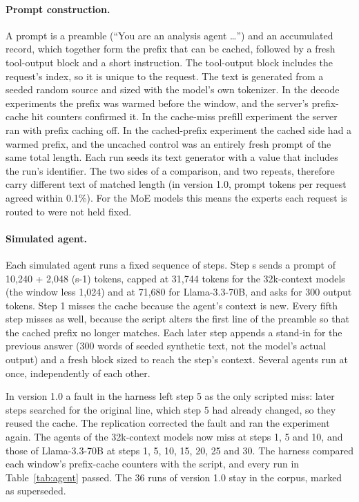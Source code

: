 \documentclass[11pt]{article}
\begin{document}
\paragraph{Prompt construction.} A prompt is a preamble (``You are an analysis agent \ldots{}'') and an accumulated record, which together form the prefix that can be cached, followed by a fresh tool-output block and a short instruction. The tool-output block includes the request's index, so it is unique to the request. The text is generated from a seeded random source and sized with the model's own tokenizer. In the decode experiments the prefix was warmed before the window, and the server's prefix-cache hit counters confirmed it. In the cache-miss prefill experiment the server ran with prefix caching off. In the cached-prefix experiment the cached side had a warmed prefix, and the uncached control was an entirely fresh prompt of the same total length. Each run seeds its text generator with a value that includes the run's identifier. The two sides of a comparison, and two repeats, therefore carry different text of matched length (in version 1.0, prompt tokens per request agreed within 0.1\%). For the MoE models this means the experts each request is routed to were not held fixed.

\paragraph{Simulated agent.} Each simulated agent runs a fixed sequence of steps. Step s sends a prompt of 10,240 + 2,048 (s-1) tokens, capped at 31,744 tokens for the 32k-context models (the window less 1,024) and at 71,680 for Llama-3.3-70B, and asks for 300 output tokens. Step 1 misses the cache because the agent's context is new. Every fifth step misses as well, because the script alters the first line of the preamble so that the cached prefix no longer matches. Each later step appends a stand-in for the previous answer (300 words of seeded synthetic text, not the model's actual output) and a fresh block sized to reach the step's context. Several agents run at once, independently of each other.

In version 1.0 a fault in the harness left step 5 as the only scripted miss: later steps searched for the original line, which step 5 had already changed, so they reused the cache. The replication corrected the fault and ran the experiment again. The agents of the 32k-context models now miss at steps 1, 5 and 10, and those of Llama-3.3-70B at steps 1, 5, 10, 15, 20, 25 and 30. The harness compared each window's prefix-cache counters with the script, and every run in Table~\ref{tab:agent} passed. The 36 runs of version 1.0 stay in the corpus, marked as superseded.
\end{document}
